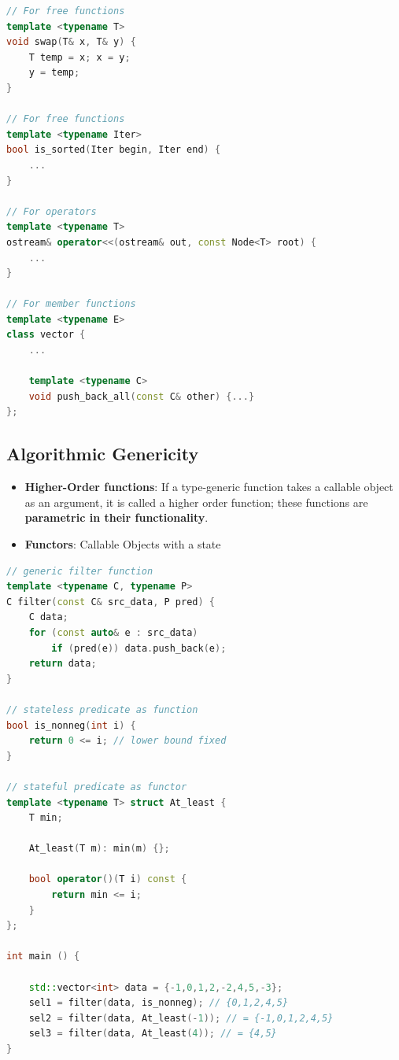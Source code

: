 \begin{lstlisting}[language=C++]
// For free functions
template <typename T> 
void swap(T& x, T& y) {
    T temp = x; x = y;
    y = temp;
}

// For free functions
template <typename Iter>
bool is_sorted(Iter begin, Iter end) {
    ...
}

// For operators
template <typename T>
ostream& operator<<(ostream& out, const Node<T> root) {
    ...
}

// For member functions
template <typename E>
class vector {
    ...
    
    template <typename C>
    void push_back_all(const C& other) {...} 
};
\end{lstlisting}
\vspace{-4pt}
\begin{sectionbox}
\subsection{Algorithmic Genericity}\smallskip
\begin{itemize}
    \item \textbf{Higher-Order functions}: If a type-generic function takes a callable object as an argument, it is called a higher order function; these functions are \textbf{parametric in their functionality}.
    \item \textbf{Functors}: Callable Objects with a state
\end{itemize}

\end{sectionbox}
\begin{lstlisting}[language=C++]
// generic filter function
template <typename C, typename P>
C filter(const C& src_data, P pred) {
    C data;
    for (const auto& e : src_data)
        if (pred(e)) data.push_back(e); 
    return data;
}

// stateless predicate as function
bool is_nonneg(int i) {
    return 0 <= i; // lower bound fixed
}

// stateful predicate as functor
template <typename T> struct At_least {
    T min;

    At_least(T m): min(m) {};

    bool operator()(T i) const {
        return min <= i;
    } 
};

int main () {

    std::vector<int> data = {-1,0,1,2,-2,4,5,-3};
    sel1 = filter(data, is_nonneg); // {0,1,2,4,5}
    sel2 = filter(data, At_least(-1)); // = {-1,0,1,2,4,5}
    sel3 = filter(data, At_least(4)); // = {4,5}
}
\end{lstlisting}


